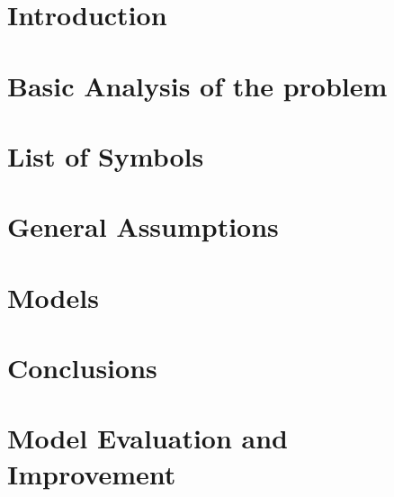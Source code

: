\documentclass[draft]{mcmthesis}
\title{}
\date{\today}
\begin{document}


\section{Introduction}
  
\section{Basic Analysis of the problem}
  
\section{List of Symbols}
  
\section{General Assumptions}
  
\section{Models}
  
\section{Conclusions}
  
\section{Model Evaluation and Improvement}
  

\newpage
{}
{}


\listoftodos

\newpage
\nocite{*}

{}




\end{document}
